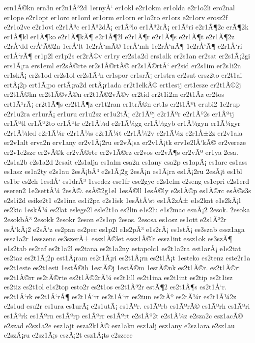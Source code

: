 {ern1Ã©kn
ern3n
er2n1Ã³2d
1ernyÅ‘
er1okl
e2r1okm
er1olda
e2r1o2li
ero2nal
er1ope
e2r1opt
er1orc
er1ord
er1orm
er1orn
er1o2ro
er1ors
e2r1orv
erosz2f
e2r1o2ve
e2r1ovi
e2r1Ã³c
er1Ã³2dÃ¡
er1Ã³lo
er1Ã³2rÃ¡
er1Ã³ri
e2r1Ã¶2c
erÃ¶2k
er1Ã¶kl
er1Ã¶ko
e2r1Ã¶kÃ¶
e2r1Ã¶2l
e2r1Ã¶r
e2r1Ã¶s
e2r1Ã¶t
e2r1Ã¶2z
e2rÅ‘dd
erÅ‘Ã©2n
1erÅ‘lt
1e2rÅ‘mÃ©
1erÅ‘mh
1e2rÅ‘nÃ¶
1e2rÅ‘Ã¶
e2r1Å‘ri
er1Å‘rÃ¶
er1p2l
er1p2s
er2rÃ©v
er1ry
er2s1a2d
ers1alk
er2s1an
er2sat
er2s1Ã¡2gi
ers1Ã¡ra
ers1eml
er2sÃ©rte
er2s1Ã©rtÃ©
er2s1Ã©rtÅ‘
er2sid
er2s1im
er2s1i2n
er1skÃ¡
er2s1od
er2s1ol
er2s1Ã³n
er1spor
er1srÃ¡
er1stra
er2sut
ersz2to
er2t1ai
ertÃ¡2p
ert1Ã¡po
ertÃ¡ra2d
ertÃ¡r1ada
er2t1elkÃ©
ert1estj
ert1esze
er2t1Ã©2j
er2t1Ã©kn
er2t1Ã©vÃ©n
er2t1Ã©2vÃ©v
er2tid
er2t1i2m
er2t1Ã­z
er2tos
ert1Ã³rÃ¡
er2t1Ã¶s
er2t1Ã¶z
er1t2ran
er1trÃ©n
ert1s
er2t1Ãºt
erubi2
1e2rup
e2r1u2ra
er1urÃ¡
er1uru
er1u2sz
er1u2tÃ¡
e2r1Ãºj
e2r1Ãºr
e2r1Ãº2s
er1Ãºtj
er1Ãºtl
er1Ãº2to
er1Ãºtr
e2r1Ã¼d
e2r1Ã¼gg
er1Ã¼gyb
er1Ã¼gyn
er1Ã¼gyr
e2r1Ã¼led
e2r1Ã¼r
e2r1Ã¼s
e2r1Ã¼t
e2r1Ã¼2v
e2r1Ã¼z
e2r1Å±2z
er2v1ala
er2v1alt
erva2n
erv1any
er2v1Ã¡2ru
er2vÃ¡sa
er2v1Ã¡tk
erv1e2lÅ‘kÃ©
er2vereze
er2v1e2sze
er2vÃ©k
er2vÃ©rte
er2v1Ã©rz
er2vos
er2vÃ¶s
er2vÃº
er1ya
2esa.
e2s1a2b
e2s1a2d
2esait
e2s1alja
es1alm
esa2n
es1any
esa2p
es1apÃ¡
es1arc
es1ass
es1asz
es1a2ty
e2s1au
2esÃ¡bÃ³
e2s1Ã¡2g
2esÃ¡n
es1Ã¡ra
es1Ã¡2ru
2esÃ¡t
es1bl
es1br
es2ch
1esdÅ‘
es1drÃ³
1esedez
ese1fr
ese2gye
e2s1elm
e2seng
es1epri
e2s1erd
eseren2
1e2settÃ¼
2esÃ©.
esÃ©2g1el
1esÃ©ll
1esÃ©ly
e2s1Ã©p
es1Ã©rc
esÃ©s3s
e2s1i2d
esike2t1
e2s1ina
es1i2pa
e2s1isk
1esÃ­tÅ‘st
es1Ã­2zÅ±
e1s2kat
e1s2kÃ¡l
es2kic
1eskÃ¼
es2lat
eslege2l
esle2t1o
es2lin
e1s2lu
e1s2mac
esnÃ¡2
2esok.
2esoka
2esokbÃ³
2esokk
2esokr
2eson
e2s1op
2esos.
2esosa
es1osz
es1ott
e2s1Ã³2r
esÅ‘kÃ¡2
e2sÅ‘z
es2pan
es2pec
es1p2l
e1s2pÃ³
e1s2rÃ¡
es1stÃ¡
es3szab
essz1aga
essz1a2r
1esszenc
es3szerÅ±
essz1Ã©let
essz1Ã©lt
essz1int
essz1ok
es3szÃ¶
e1s2tab
es2taf
es2t1a2l
es2tana
es2t1a2ny
estapolc1
es2t1a2ra
est1arÃ¡
e1s2tat
es2taz
es2t1Ã¡2p
est1Ã¡ram
es2t1Ã¡ri
es2t1Ã¡rn
es2t1Ã¡t
1esteko
es2tenz
este2r1a
es2t1este
es2t1esti
1estÃ©ih
1estÃ©j
1estÃ©m
1estÃ©nk
es2t1Ã©r.
es2t1Ã©ri
es2t1Ã©rr
es2tÃ©rte
es2t1Ã©2rÃ¼
es2t1ill
es2t1ina
es2t1int
es2tip
es2t1isz
es2tiz
es2t1ol
e1s2top
esto2r
es2t1os
es2t1Ã³2r
estÃ¶2
es2t1Ã¶s
es2t1Å‘r.
es2t1Å‘rk
es2t1Å‘rÃ¶
es2t1Å‘rr
es2t1Å‘rt
es2tun
es2tÃº
es2tÃ¼r
es2t1Ã¼2z
e2s1ud
esu2r
es1ura
es1urÃ¡
e2s1utÃ¡
es1Ãºr.
es1Ãºrb
es1ÃºrÃ©
es1Ãºrh
es1Ãºri
es1Ãºrk
es1Ãºrn
es1Ãºrp
es1Ãºrr
es1Ãºrt
e2s1Ãº2t
e2s1Ã¼z
e2sza2c
esz1acÃ©
e2szad
e2sz1a2e
esz1ajt
esza2k1Ã©
esz1akn
esz1alj
esz1any
e2sz1ara
e2sz1au
e2szÃ¡ru
e2sz1Ã¡s
eszÃ¡2t
esz1Ã¡ts
e2szece
}
